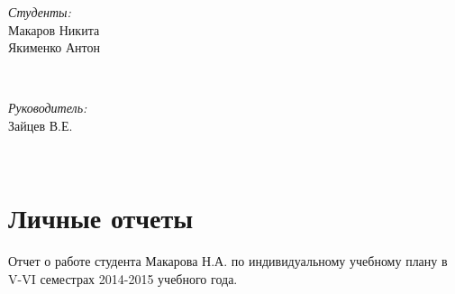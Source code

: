 \documentclass[a4paper,12pt]{article}
\begin{document}
\begin{titlepage}

\begin{minipage}{0.4\textwidth}
\begin{flushleft} \large
\emph{Студенты:}\\
Макаров Никита\\Якименко Антон
\end{flushleft}
\end{minipage}
~
\begin{minipage}{0.4\textwidth}
\begin{flushright} \large
\emph{Руководитель:} \\
Зайцев В.Е.
\end{flushright}
\end{minipage}\\[2cm]



\vfill %

\end{titlepage}



\tableofcontents
\newpage



\section{Личные отчеты}

Отчет о работе студента Макарова Н.А. по индивидуальному учебному плану в V-VI семестрах 2014-2015 учебного года.
\end{document}
